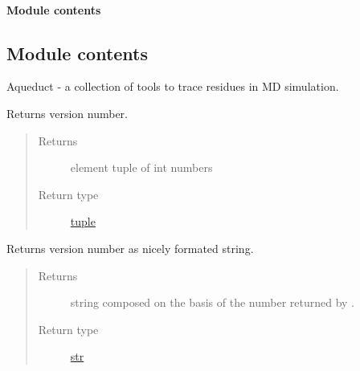 \documentclass[a4paper,10pt,english]{sphinxmanual}
\begin{document}
\paragraph{Module contents}
\label{aqueduct.visual:module-aqueduct.visual}\label{aqueduct.visual:module-contents}

\subsection{Module contents}
\label{aqueduct:module-aqueduct}\label{aqueduct:module-contents}
Aqueduct - a collection of tools to trace residues in MD simulation.

\begin{fulllineitems}
\label{aqueduct:aqueduct.version}
Returns {\hyperref[aqueduct:module\string-aqueduct]{}} version number.
\begin{quote}\begin{description}
\item[{Returns}]  element tuple of int numbers

\item[{Return type}] \leavevmode
\href{http://docs.python.org/2/library/functions.html\#tuple}{tuple}

\end{description}\end{quote}

\end{fulllineitems}


\begin{fulllineitems}
\label{aqueduct:aqueduct.version_nice}
Returns {\hyperref[aqueduct:module\string-aqueduct]{}} version number as nicely formated string.
\begin{quote}\begin{description}
\item[{Returns}] \leavevmode
string composed on the basis of the number returned by {\hyperref[aqueduct:aqueduct.version]{}}.

\item[{Return type}] \leavevmode
\href{http://docs.python.org/2/library/functions.html\#str}{str}

\end{description}\end{quote}

\end{fulllineitems}
\end{document}
